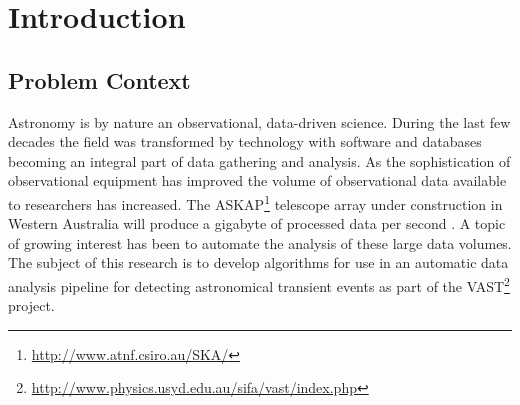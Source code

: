 \chapter{Introduction}

\section{Problem Context}
	Astronomy is by nature an observational, data-driven science. During the last few decades the field was transformed by technology with software and databases becoming an integral part of data gathering and analysis. As the sophistication of observational equipment has improved the volume of observational data available to researchers has increased. The ASKAP\footnote{\url{http://www.atnf.csiro.au/SKA/}} telescope array under construction in Western Australia will produce a gigabyte of processed data per second . A topic of growing interest has been to automate the analysis of these large data volumes. The subject of this research is to develop algorithms for use in an automatic data analysis pipeline for detecting astronomical transient events as part of the VAST\footnote{\url{http://www.physics.usyd.edu.au/sifa/vast/index.php}} project.
